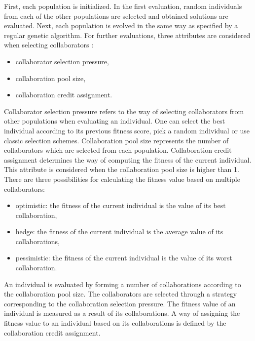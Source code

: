 First, each population is initialized.
In the first evaluation, random individuals from each of the other populations are selected and obtained solutions are evaluated. 
Next, each population is evolved in the same way as specified by a regular genetic algorithm.
For further evaluations, three attributes are considered when selecting collaborators 
\cite{stoean2014support}:
\begin{itemize}
	\item collaborator selection pressure, 
	\item collaboration pool size,
	\item collaboration credit assignment.
\end{itemize}
Collaborator selection pressure refers to the way of selecting collaborators from other populations when evaluating an individual. 
One can select the best individual according to its previous fitness score, pick a random individual or use classic selection schemes. 
Collaboration pool size represents the number of collaborators which are selected from each population. 
Collaboration credit assignment determines the way of computing the fitness of the current individual. This attribute is considered when the collaboration pool size is higher than 1. 
There are three possibilities for calculating the fitness value based on multiple collaborators:
\begin{itemize}
	\item optimistic: the fitness of the current individual is the value of its best collaboration,
	\item hedge: the fitness of the current individual is the average value of its collaborations,
	\item pessimistic: the fitness of the current individual is the value of its worst collaboration. 
\end{itemize}
An individual is evaluated by forming a number of collaborations according to the collaboration pool size. The collaborators are selected through a strategy corresponding to the collaboration selection pressure. 
The fitness value of an individual is measured as a result of its collaborations.
A way of assigning the fitness value to an individual based on its collaborations is defined by the collaboration credit assignment.
